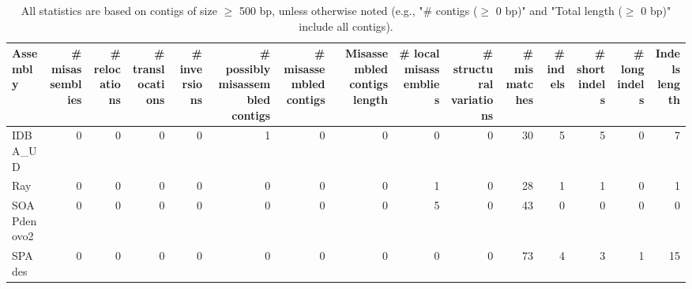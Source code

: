 \documentclass[12pt,a4paper]{article}
\begin{document}
\begin{table}[ht]
\begin{center}
\caption{All statistics are based on contigs of size $\geq$ 500 bp, unless otherwise noted (e.g., "\# contigs ($\geq$ 0 bp)" and "Total length ($\geq$ 0 bp)" include all contigs).}
\begin{tabular}{|l*{14}{|r}|}
\hline
Assembly & \# misassemblies &     \# relocations &     \# translocations &     \# inversions & \# possibly misassembled contigs & \# misassembled contigs & Misassembled contigs length & \# local misassemblies & \# structural variations & \# mismatches & \# indels &     \# short indels &     \# long indels & Indels length \\ \hline
IDBA\_UD & 0 & 0 & 0 & 0 & 1 & 0 & 0 & 0 & 0 & 30 & 5 & 5 & 0 & 7 \\ \hline
Ray & 0 & 0 & 0 & 0 & 0 & 0 & 0 & 1 & 0 & 28 & 1 & 1 & 0 & 1 \\ \hline
SOAPdenovo2 & 0 & 0 & 0 & 0 & 0 & 0 & 0 & 5 & 0 & 43 & 0 & 0 & 0 & 0 \\ \hline
SPAdes & 0 & 0 & 0 & 0 & 0 & 0 & 0 & 0 & 0 & 73 & 4 & 3 & 1 & 15 \\ \hline
\end{tabular}
\end{center}
\end{table}
\end{document}
